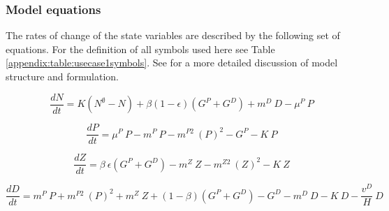 \documentclass[journal abbreviations, manuscript]{copernicus}
\begin{document}
\clearpage
\subsubsection{Model equations}
The rates of change of the state variables are described by the following set of equations. For the definition of all symbols used here see Table \ref{appendix:table:usecase1symbols}. See \citet{Anderson2015c} for a more detailed discussion of model structure and formulation.

\begin{equation}
    \frac{d N}{d t} = 
    K (N^\emptyset - N) %
    + \beta(1 - \epsilon)(G^P + G^D) %
    + m^D \ D %
    - \mu^{P} \ P %
\end{equation}

\begin{equation}
    \frac{d P}{d t} =
    \mu^{P} \ P  %
    - m^P \ P %
    - m^{P2} \ (P)^2 %
    - G^P %
    - K \ P %
\end{equation}

\begin{equation}
    \frac{d Z}{d t} =
    \beta \ \epsilon(G^P + G^D) %
    - m^Z \ Z %
    - m^{Z2} \ (Z)^2 %
    - K \ Z %
\end{equation}

\begin{equation}
    \frac{d D}{d t} = 
    m^P \ P %
    + m^{P2} \ (P)^2 %
    + m^Z \ Z %
    + (1 - \beta)(G^P + G^D) %
    - G^D %
    - m^D \ D %
    - K \ D %
    - \frac{v^D}{H} \ D %
\end{equation}



\clearpage
\end{document}

